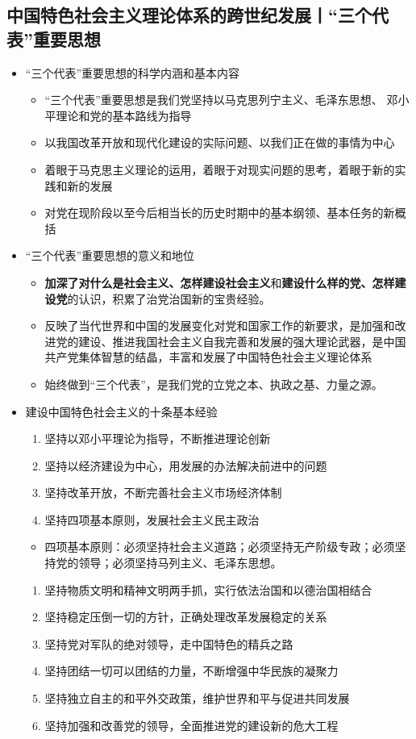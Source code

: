 \documentclass[12pt,openany]{ctexbook}
\begin{document}
\subsection{中国特色社会主义理论体系的跨世纪发展丨“三个代表”重要思想}
\begin{itemize}
  \item “三个代表”重要思想的科学内涵和基本内容
\begin{itemize}
  \item “三个代表”重要思想是我们党坚持以马克思列宁主义、毛泽东思想、 邓小平理论和党的基本路线为指导
  \item 以我国改革开放和现代化建设的实际问题、以我们正在做的事情为中心
  \item 着眼于马克思主义理论的运用，着眼于对现实问题的思考，着眼于新的实践和新的发展
  \item 对党在现阶段以至今后相当长的历史时期中的基本纲领、基本任务的新概括
\end{itemize}
  \item “三个代表”重要思想的意义和地位
\begin{itemize}
  \item \textbf{加深了对什么是社会主义、怎样建设社会主义}和\textbf{建设什么样的党、怎样建设党}的认识，积累了治党治国新的宝贵经验。
  \item 反映了当代世界和中国的发展变化对党和国家工作的新要求，是加强和改进党的建设、推进我国社会主义自我完善和发展的强大理论武器，是中国共产党集体智慧的结晶，丰富和发展了中国特色社会主义理论体系
  \item 始终做到“三个代表”，是我们党的立党之本、执政之基、力量之源。
\end{itemize}
  \item 建设中国特色社会主义的十条基本经验
\begin{enumerate}
  \item 坚持以邓小平理论为指导，不断推进理论创新
  \item 坚持以经济建设为中心，用发展的办法解决前进中的问题
  \item 坚持改革开放，不断完善社会主义市场经济体制
  \item 坚持四项基本原则，发展社会主义民主政治
\end{enumerate}
\begin{itemize}
  \item 四项基本原则：必须坚持社会主义道路；必须坚持无产阶级专政；必须坚持党的领导；必须坚持马列主义、毛泽东思想。
\end{itemize}
\begin{enumerate}
  \item 坚持物质文明和精神文明两手抓，实行依法治国和以德治国相结合
  \item 坚持稳定压倒一切的方针，正确处理改革发展稳定的关系
  \item 坚持党对军队的绝对领导，走中国特色的精兵之路
  \item 坚持团结一切可以团结的力量，不断增强中华民族的凝聚力
  \item 坚持独立自主的和平外交政策，维护世界和平与促进共同发展
  \item 坚持加强和改善党的领导，全面推进党的建设新的危大工程
\end{enumerate}
\end{itemize}
\end{document}
